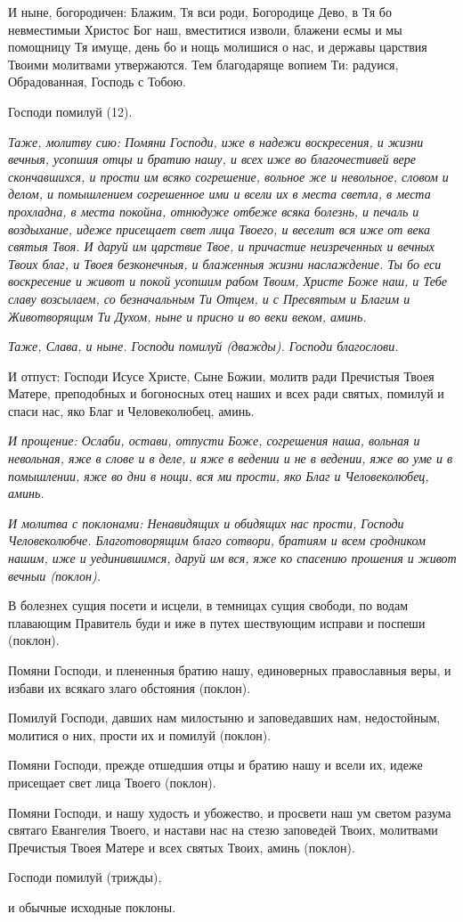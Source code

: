 И ныне, богородичен: Блажим, Тя вси роди, Богородице Дево, в Тя бо невместимыи Христос Бог наш, вместитися изволи, блажени есмы и мы помощницу Тя имуще, день бо и нощь молишися о нас, и державы царствия Твоими молитвами утвержаются. Тем благодаряще вопием Ти: радуися, Обрадованная, Господь с Тобою. 

Господи помилуй (12).


\itshape Таже, молитву сию:\normalfont{} Помяни Господи, иже в надежи воскресения, и жизни вечныя, усопшия отцы и братию нашу, и всех иже во благочестивей вере скончавшихся, и прости им всяко согрешение, вольное же и невольное, словом и делом, и помышлением согрешенное ими и всели их в места светла, в места прохладна, в места покойна, отнюдуже отбеже всяка болезнь, и печаль и воздыхание, идеже присещает свет лица Твоего, и веселит вся иже от века святыя Твоя. И даруй им царствие Твое, и причастие неизреченных и вечных Твоих благ, и Твоея безконечныя, и блаженныя жизни наслаждение. Ты бо еси воскресение и живот и покой усопшим рабом Твоим, Христе Боже наш, и Тебе славу возсылаем, со безначальным Ти Отцем, и с Пресвятым и Благим и Животворящим Ти Духом, ныне и присно и во веки веком, аминь. 

\itshape Таже, Слава, и ныне. Господи помилуй (дважды). Господи благослови. 

И отпуст:\normalfont{} Господи Исусе Христе, Сыне Божии, молитв ради Пречистыя Твоея Матере, преподобных и богоносных отец наших и всех ради святых, помилуй и спаси нас, яко Благ и Человеколюбец, аминь. 

\itshape И прощение:\normalfont{} Ослаби, остави, отпусти Боже, согрешения наша, вольная и невольная, яже в слове и в деле, и яже в ведении и не в ведении, яже во уме и в помышлении, яже во дни в нощи, вся ми прости, яко Благ и Человеколюбец, аминь.


\itshape И молитва с поклонами:\normalfont{} Ненавидящих и обидящих нас прости, Господи Человеколюбче. Благотоворящим благо сотвори, братиям и всем сродником нашим, иже и уединившимся, даруй им вся, яже ко спасению прошения и живот вечныи (поклон). 

В болезнех сущия посети и исцели, в темницах сущия свободи, по водам плавающим Правитель буди и иже в путех шествующим исправи и поспеши (поклон). 

Помяни Господи, и плененныя братию нашу, единоверных православныя веры, и избави их всякаго злаго обстояния (поклон). 

Помилуй Господи, давших нам милостыню и заповедавших нам, недостойным, молитися о них, прости их и помилуй (поклон). 

Помяни Господи, прежде отшедшия отцы и братию нашу и всели их, идеже присещает свет лица Твоего (поклон). 

Помяни Господи, и нашу худость и убожество, и просвети наш ум светом разума святаго Евангелия Твоего, и настави нас на стезю заповедей Твоих, молитвами Пречистыя Твоея Матере и всех святых Твоих, аминь (поклон). 

Господи помилуй (трижды),

и обычные исходные поклоны.
\mychapterending
